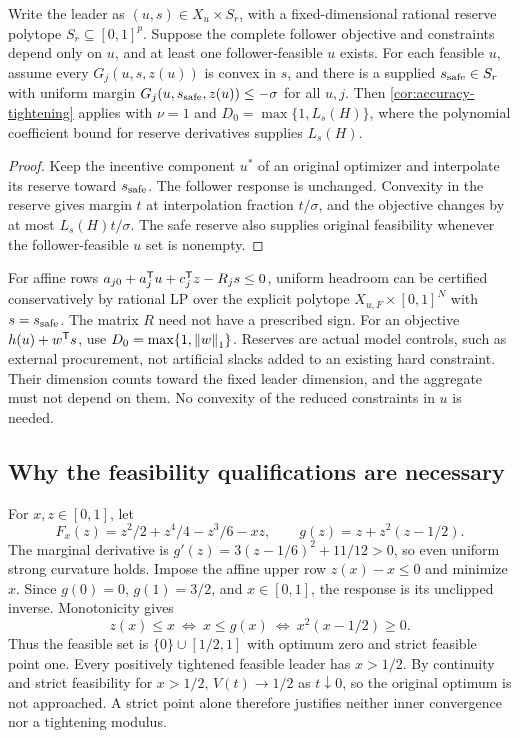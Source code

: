 \begin{corollary}
\label{cor:accuracy-reserve}
Write the leader as $(u,s)\in X_u\times S_r$, with a fixed-dimensional
rational reserve polytope $S_r\subseteq[0,1]^p$. Suppose the complete
follower objective and constraints depend only on $u$, and at least one
follower-feasible $u$ exists. For each feasible
$u$, assume every $G_j(u,s,z(u))$ is convex in $s$, and there is a
supplied $s_{\rm safe}\in S_r$ with uniform margin
$G_j(u,s_{\rm safe},z(u))\le-\sigma$ for all $u,j$.
Then \cref{cor:accuracy-tightening} applies with $\nu=1$ and
$D_0=\max\{1,L_s(H)\}$, where the polynomial coefficient bound for
reserve derivatives supplies $L_s(H)$.
\end{corollary}
\begin{proof}
Keep the incentive component $u^*$ of an original optimizer and
interpolate its reserve toward $s_{\rm safe}$. The follower response
is unchanged. Convexity in the reserve gives margin $t$ at interpolation
fraction $t/\sigma$, and the objective changes by at most
$L_s(H)t/\sigma$. The safe reserve also supplies original feasibility
whenever the follower-feasible $u$ set is nonempty.
\end{proof}

For affine rows $a_{j0}+a_j^{\mathsf T} u+c_j^{\mathsf T} z-R_js\le0$,
uniform headroom can be certified conservatively by rational LP over
the explicit polytope $X_{u,F}\times[0,1]^N$ with $s=s_{\rm safe}$.
The matrix $R$ need not have a prescribed sign. For an objective
$h(u)+w^{\mathsf T} s$, use $D_0=\max\{1,\left\lVert w\right\rVert_1\}$. Reserves are
actual model controls, such as external procurement, not artificial
slacks added to an existing hard constraint. Their dimension counts
toward the fixed leader dimension, and the aggregate must not depend on
them. No convexity of the reduced constraints in $u$ is needed.

\subsection{Why the feasibility qualifications are necessary}
\label{subsec:accuracy-limits}

\begin{example}
\label{ex:accuracy-isolated-optimum}
For $x,z\in[0,1]$, let
\[
 F_x(z)=z^2/2+z^4/4-z^3/6-xz,\qquad
 g(z)=z+z^2(z-1/2).
\]
The marginal derivative is
$g'(z)=3(z-1/6)^2+11/12>0$, so even uniform strong curvature holds.
Impose the affine upper row $z(x)-x\le0$ and minimize $x$.
Since $g(0)=0$, $g(1)=3/2$, and $x\in[0,1]$, the response is its
unclipped inverse. Monotonicity gives
\[
 z(x)\le x\ \Longleftrightarrow\ x\le g(x)
                  \ \Longleftrightarrow\ x^2(x-1/2)\ge0.
\]
Thus the feasible set is $\{0\}\cup[1/2,1]$ with optimum zero and
strict feasible point one. Every positively tightened feasible leader
has $x>1/2$. By continuity and strict feasibility for $x>1/2$,
$V(t)\to1/2$ as $t\downarrow0$, so the original optimum is not
approached. A strict point alone therefore justifies neither inner
convergence nor a tightening modulus.
\end{example}

